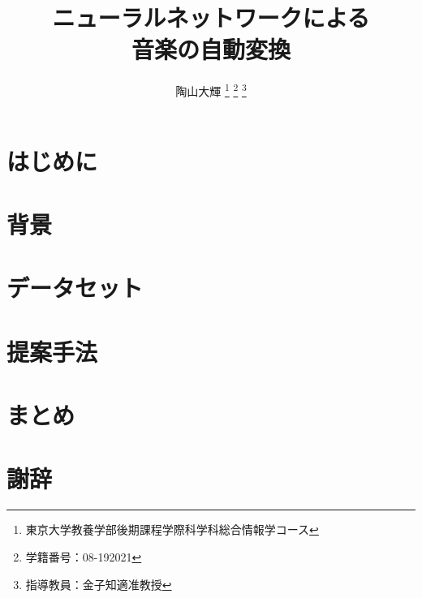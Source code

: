 \documentclass[dvipdfmx]{jreport}
\title{ニューラルネットワークによる\\ 音楽の自動変換}
\author{陶山大輝 \thanks{東京大学教養学部後期課程学際科学科総合情報学コース} \thanks{学籍番号：08-192021} \thanks{指導教員：金子知適准教授}}
\begin{document}
\maketitle


\tableofcontents


\chapter{はじめに}


\chapter{背景}


\chapter{データセット}

%


\chapter{提案手法}


\chapter{まとめ}


\chapter*{謝辞}




\end{document}
